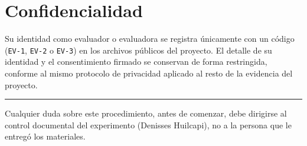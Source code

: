 \documentclass[11pt,a4paper]{article}
\begin{document}
\section{Confidencialidad}

Su identidad como evaluador o evaluadora se registra únicamente con un
código (\texttt{EV-1}, \texttt{EV-2} o \texttt{EV-3}) en los archivos
públicos del proyecto. El detalle de su identidad y el consentimiento
firmado se conservan de forma restringida, conforme al mismo protocolo de
privacidad aplicado al resto de la evidencia del proyecto.

\vfill
\hrule
\vspace{0.2cm}
{\small Cualquier duda sobre este procedimiento, antes de comenzar, debe
dirigirse al control documental del experimento (Denisses Huilcapi), no a
la persona que le entregó los materiales.\par}
\end{document}
